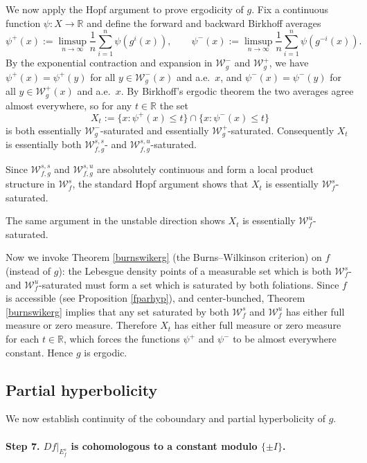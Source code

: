 \documentclass[11pt]{amsart}
\numberwithin{equation}{section}
\newcommand{\R}{\mathbb{R}}
\newcommand{\W}{\mathcal{W}}
\theoremstyle{plain}
\begin{document}
We now apply the Hopf argument to prove ergodicity of $g$. Fix a
continuous function $\psi:X\to\R$ and define the forward and backward
Birkhoff averages
\[
\psi^+(x):=\limsup_{n\to\infty}\frac{1}{n}\sum_{i=1}^n\psi(g^i(x)),
\qquad
\psi^-(x):=\limsup_{n\to\infty}\frac{1}{n}\sum_{i=1}^n\psi(g^{-i}(x)).
\]
By the exponential contraction and expansion in $\mathcal W^-_g$ and $\mathcal W^+_g$, we have
$\psi^+(x)=\psi^+(y)$ for all $y\in\mathcal W^-_g(x)$ and a.e.\ $x$, and
$\psi^-(x)=\psi^-(y)$ for all $y\in\mathcal W^+_g(x)$ and a.e.\ $x$. By
Birkhoff's ergodic theorem the two averages agree almost everywhere, so
for any $t\in\R$ the set
\[
X_t:=\{x:\psi^+(x)\le t\}\cap\{x:\psi^-(x)\le t\}
\]
is both essentially $\mathcal W^-_g$-saturated and essentially
$\mathcal W^+_g$-saturated. Consequently $X_t$ is essentially both
$\mathcal W^{s,s}_{f,g}$- and $\mathcal W^{s,u}_{f,g}$-saturated.

Since $\W^{s,s}_{f,g}$ and $\W^{s,u}_{f,g}$ are absolutely continuous and form a local product structure in $\W^s_f$, the standard Hopf argument shows that $X_t$ is
essentially $\mathcal W^s_f$-saturated. 

The same argument in the
unstable direction shows $X_t$ is essentially $\mathcal W^u_f$-saturated.

Now we invoke Theorem \ref{burnswikerg} (the Burns--Wilkinson criterion) on $f$ (instead of $g$):
the Lebesgue density points of a measurable set which is both
$\mathcal W^s_f$- and $\mathcal W^u_f$-saturated must form a set which
is saturated by both foliations. Since $f$ is accessible (see
Proposition \ref{fparhyp}), and center-bunched, Theorem \ref{burnswikerg} implies that any set
saturated by both $\mathcal W^s_f$ and $\mathcal W^u_f$ has either full
measure or zero measure. Therefore $X_t$ has either full measure or zero
measure for each $t\in\R$, which forces the functions $\psi^+$ and
$\psi^-$ to be almost everywhere constant. Hence $g$ is ergodic.


\subsection{Partial hyperbolicity}\label{subsec:ph}
We now establish continuity of the coboundary and partial hyperbolicity of $g$.
\paragraph{\textbf{Step 7.  $Df|_{E_f^s}$ is cohomologous to a
constant modulo $\{\pm I\}$.}}
\end{document}
